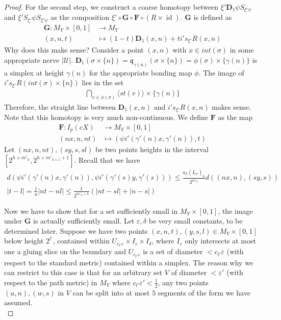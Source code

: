 \documentclass[a4paper,11pt]{article}
\theoremstyle{definition}
\theoremstyle{plain}
\theoremstyle{remark}
\DeclareMathOperator{\id}{id}
\begin{document}
{\begin{proof}
For the second step, we construct a coarse homotopy between $\xi' \mathbf{D}_{1} \psi S_{\xi' \psi}$ and $\xi' S_{\xi'} \psi S_{\xi' \psi}$ as the composition $\xi' \circ \mathbf{G}\circ \mathbf{F} \circ (R\times \id)$. $\mathbf{G}$ is defined as
\begin{align*}
\mathbf{G}: M_{Y} \times [0,1] &\rightarrow M_{Y}\\
(x,n,t) &\mapsto (1-t) \mathbf{D}_{1}(x,n) + t i's_{\xi'} R (x,n) 
\end{align*}
Why does this make sense? Consider a point $(x,n)$ with $x\in int(\sigma)$ in some appropriate nerve $|\mathcal{U}|$. $\mathbf{D}_{1}(\sigma \times \{ n\}) = \mathfrak{q}_{\gamma(n)}(\sigma \times \{n\}) = \phi(\sigma) \times \{\gamma(n)\}$ is a simplex at height $\gamma(n)$ for the appropriate bonding map $\phi$.  The image of $i's_{\xi'} R(int(\sigma) \times \{n\})$ lies in the set 
\begin{align*}
\bigcap_{v \in \phi (\sigma)} \langle st(v) \rangle  \times \{\gamma(n)\}
\end{align*} 
Therefore, the straight line between $ \mathbf{D}_{1}(x,n) $ and $i's_{\xi'} R (x,n)$ makes sense. Note that this homotopy is very much non-continuous. We define $\mathbf{F}$ as the map
\begin{align*}
\mathbf{F}: I_{p}(cX) &\rightarrow M_{Y} \times [0,1]\\
(nx,n,nt) &\mapsto (\psi i'(\gamma'(n)x,\gamma'(n)), t)
\end{align*}
Let $(nx,n,nt),(sy,s,sl)$ be two points heights in the interval  $[2^{h+m'_{h}},2^{h+m'_{h+1}+1}]$. Recall that we have 
\begin{align*}
d(\psi i'(\gamma'(n) x,\gamma'(n)), \psi i'(\gamma'(s) y,\gamma'(s)))
\leq \frac{a_{h}(L_{\psi})_{h}}{2^{m'_{h}}} d((nx,n), (sy,s))\\ 
|t-l| = \frac{1}{n}|nt-nl| \leq \frac{1}{2^{m'_{h}+h}}(|nt-sl| + |n-s|)
\end{align*}

Now we have to show that for a set sufficiently small in $M_{Y}\times [0,1]$, the image under $\mathbf{G}$ is actually sufficiently small. Let $\varepsilon, \delta$ be very small constants, to be determined later. Suppose we have two points $(x,n,t),(y,s,l) \in M_{Y} \times [0,1]$ below height $2^{l'}$, contained within $U_{c_{l'}\varepsilon} \times I_{\varepsilon} \times I_{\delta}$, where $I_{\varepsilon}$ only intersects at most one a gluing slice on the boundary and $U_{c_{l'}\varepsilon}$ is a set of diameter $<c_{l'}\varepsilon$ (with respect to the standard metric) contained within a simplex. The reason why we can restrict to this case is that for an arbitrary set $V$ of diameter $<\varepsilon'$ (with respect to the path metric) in $M_{Y}$ where $c_{l'}\varepsilon'<\frac{1}{2}$,  any two points $(u,n),(w,s)$ in $V$ can be split into at most $5$ segments of the form we have assumed. \\


\end{proof}}
\end{document}
